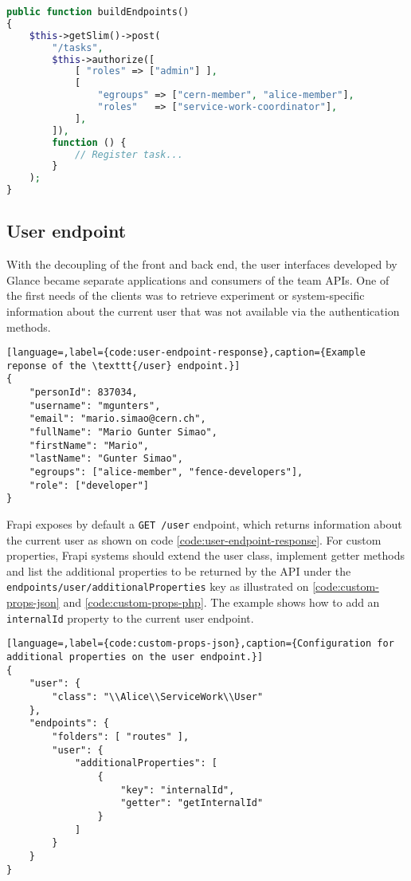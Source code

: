 \begin{lstlisting}[language=PHP,label={code:php-auth},caption={Access control configuration for a custom endpoint.}]
public function buildEndpoints()
{
    $this->getSlim()->post(
        "/tasks",
        $this->authorize([
            [ "roles" => ["admin"] ],
            [
                "egroups" => ["cern-member", "alice-member"],
                "roles"   => ["service-work-coordinator"],
            ],
        ]),
        function () {
            // Register task...
        }
    );
}
\end{lstlisting}

\subsection{User endpoint}

With the decoupling of the front and back end, the user interfaces developed by Glance became separate applications and consumers of the team APIs. One of the first needs of the clients was to retrieve experiment or system-specific information about the current user that was not available via the authentication methods. 

\begin{lstlisting}[language=,label={code:user-endpoint-response},caption={Example reponse of the \texttt{/user} endpoint.}]
{
	"personId": 837034,
	"username": "mgunters",
	"email": "mario.simao@cern.ch",
	"fullName": "Mario Gunter Simao",
	"firstName": "Mario",
	"lastName": "Gunter Simao",
	"egroups": ["alice-member", "fence-developers"],
	"role": ["developer"]
}
\end{lstlisting}

Frapi exposes by default a \texttt{GET /user} endpoint, which returns information about the current user as shown on code \autoref{code:user-endpoint-response}. For custom properties, Frapi systems should extend the user class, implement getter methods and list the additional properties to be returned by the API under the \texttt{endpoints/user/additionalProperties} key as illustrated on \autoref{code:custom-props-json} and \autoref{code:custom-props-php}. The example shows how to add an \texttt{internalId} property to the current user endpoint.

\begin{lstlisting}[language=,label={code:custom-props-json},caption={Configuration for additional properties on the user endpoint.}]
{
    "user": {
        "class": "\\Alice\\ServiceWork\\User"
    },
    "endpoints": {
        "folders": [ "routes" ],
        "user": {
            "additionalProperties": [
                {
                    "key": "internalId",
                    "getter": "getInternalId"
                }
            ]
        }
    }
}
\end{lstlisting}

